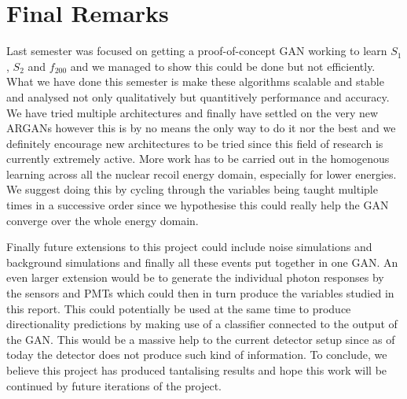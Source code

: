 \documentclass[11pt]{article} %
\begin{document}
\section{Final Remarks}
Last semester was focused on getting a proof-of-concept GAN working to learn $S_1$, $S_2$ and $f_{200}$ and we managed to show this could be done but not efficiently.
What we have done this semester is make these algorithms scalable and stable and analysed not only qualitatively but quantitively performance and accuracy.
We have tried multiple architectures and finally have settled on the very new ARGANs however this is by no means
the only way to do it nor the best and we definitely encourage new architectures to be tried since this field of research is currently extremely active.
More work has to be carried out in the homogenous learning across all the nuclear recoil energy domain, especially for lower energies.
We suggest doing this by cycling through the variables being taught multiple times in a successive order since we hypothesise this could
really help the GAN converge over the whole energy domain.
\\
\par Finally future extensions to this project could include noise simulations and background simulations and finally all these events put together in one GAN.
An even larger extension would be to generate the individual photon responses by the sensors and PMTs which could then in turn produce the variables studied in this report.
This could potentially be used at the same time to produce directionality predictions by making use of a classifier connected to the output of the GAN.
This would be a massive help to the current detector setup since as of today the detector does not produce such kind of information.
To conclude, we believe this project has produced tantalising results and hope this work will be continued by future iterations of the project.
\newpage
\printbibliography
\end{document}
